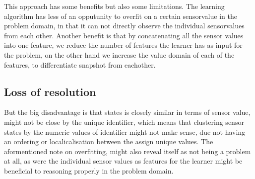 This approach has some benefits but also some limitations. The learning algorithm has less of an opputunity to overfit on a certain sensorvalue in the problem domain, in that it can not directly observe the individual sensorvalues from each other.
Another benefit is that by concatenating all the sensor values into one feature, we reduce the number of features the learner has as input for the problem, on the other hand we increase the value domain of each of the features, to differentiate snapshot from eachother.

\subsection{Loss of resolution}

But the big disadvantage is that states is closely similar in terms of sensor value, might not be close by the unique identifier, which means that clustering sensor states by the numeric values of identifier might not make sense, due not having an ordering or localicalisation between the assign unique values.
The aformentioned note on overfitting, might also reveal itself as not being a problem at all, as were the individual sensor values as features for the learner might be beneficial to reasoning properly in the problem domain.
